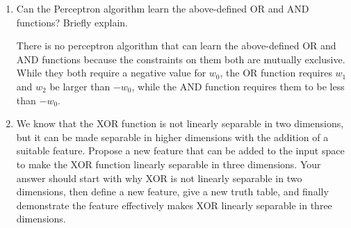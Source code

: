 \documentclass[11pt]{article}
\begin{document}
\begin{enumerate}[(1)]
\begin{answertext}{6cm}{}
        \end{answertext}


        \item Can the Perceptron algorithm learn the above-defined OR and AND functions? Briefly explain.
        
        \begin{answertext}{3cm}{}

There is no perceptron algorithm that can learn the above-defined OR and AND functions because the constraints on them both are mutually exclusive. While they both require a negative value for $w_0$, the OR function requires $w_1$ and $w_2$ be larger than $-w_0$, while the AND function requires them to be less than $-w_0$.

        \end{answertext}
        
        \item We know that the XOR function is not linearly separable in two dimensions, but it can be made separable in higher dimensions with the addition of a suitable feature. Propose a new feature that can be added to the input space to make the XOR function linearly separable in three dimensions. Your answer should start with why XOR is not linearly separable in two dimensions, then define a new feature, give a new truth table, and finally demonstrate the feature effectively makes XOR linearly separable in three dimensions.

\end{enumerate}
\end{document}
